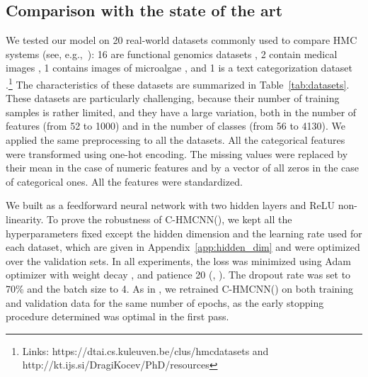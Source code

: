 \documentclass{article}
\newcommand{\system}[1]{C-HMCNN(#1)}
\begin{document}
\subsection{Comparison with the state of the art}



We tested our model on 20 real-world datasets commonly used to compare HMC systems (see, e.g.,~\cite{kwok2011,nakano2019,vens2008,cerri2018}): 16 are functional genomics datasets \citep{clare2003}, 2 contain medical images \citep{dimitrovski2008}, 1 contains images of microalgae \citep{dimitrovski2011}, and 1 is a text categorization dataset  \citep{klimt2004}.\footnote{Links: https://dtai.cs.kuleuven.be/clus/hmcdatasets and http://kt.ijs.si/DragiKocev/PhD/resources}
The characteristics of these datasets are summarized in Table~\ref{tab:datasets}. These datasets are particularly challenging,  because their number of training samples is rather limited, and they have a large variation, both in the number of features (from 52 to 1000) and in the number of classes (from 56 to 4130). We applied the same preprocessing  to all the datasets. All the categorical features were transformed using one-hot encoding. The missing values were replaced by their mean in the case of numeric features and by a vector of all zeros in the case of categorical ones. All the features were standardized. 


We built  as a feedforward neural network with two 
hidden layers and ReLU non-linearity.
 To prove the robustness of \system{},
 we kept all the hyperparameters fixed except the hidden dimension and the learning rate used for each dataset, which are given in Appendix~\ref{app:hidden_dim} and were optimized over the validation sets. In all experiments, the loss was minimized using Adam optimizer with weight decay , and patience 20 (, ). The dropout rate was set to 70\% and the batch size to 4. 
As in \citep{cerri2018}, we retrained \system{} on both training and validation data for the same number of epochs, as the early stopping procedure determined was optimal in the first pass.
\end{document}
